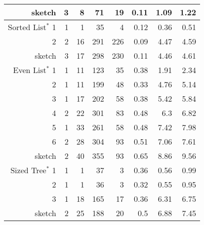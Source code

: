 \begin{tabular}{r|rr|rrrrr}
                   sketch &        3 &             8 &         71 &       19 &            0.11 &            1.09 &            1.22 \\
\midrule
        Sorted List$^*$ 1 &        1 &             1 &         35 &        4 &            0.12 &            0.36 &            0.51 \\
                        2 &        2 &            16 &        291 &      226 &            0.09 &            4.47 &            4.59 \\
                   sketch &        3 &            17 &        298 &      230 &            0.11 &            4.46 &            4.61 \\
\midrule
          Even List$^*$ 1 &        1 &            11 &        123 &       35 &            0.38 &            1.91 &            2.34 \\
                        2 &        1 &            11 &        199 &       48 &            0.33 &            4.76 &            5.14 \\
                        3 &        1 &            17 &        202 &       58 &            0.38 &            5.42 &            5.84 \\
                        4 &        2 &            22 &        301 &       83 &            0.48 &            6.3  &            6.82 \\
                        5 &        1 &            33 &        261 &       58 &            0.48 &            7.42 &            7.98 \\
                        6 &        2 &            28 &        304 &       93 &            0.51 &            7.06 &            7.61 \\
                   sketch &        2 &            40 &        355 &       93 &            0.65 &            8.86 &            9.56 \\
  \hhline{=|==|=====}
         Sized Tree$^*$ 1 &        1 &             1 &         37 &        3 &            0.36 &            0.56 &            0.99 \\
                        2 &        1 &             1 &         36 &        3 &            0.32 &            0.55 &            0.95 \\
                        3 &        1 &            18 &        165 &       17 &            0.36 &            6.31 &            6.75 \\
                   sketch &        2 &            25 &        188 &       20 &            0.5  &            6.88 &            7.45 \\

\end{tabular}
